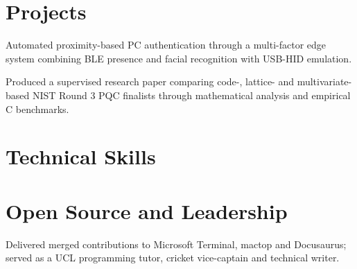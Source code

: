 \vfill
\section{Projects}

\begin{resumeBullets}
  \item Automated proximity-based PC authentication through a multi-factor edge system combining BLE presence and facial recognition with USB-HID emulation.
\end{resumeBullets}

\begin{resumeBullets}
  \item Produced a supervised research paper comparing code-, lattice- and multivariate-based NIST Round 3 PQC finalists through mathematical analysis and empirical C benchmarks.
\end{resumeBullets}

\vfill
\section{Technical Skills}

\vfill
\section{Open Source and Leadership}
\begin{resumeBullets}
  \item Delivered merged contributions to Microsoft Terminal, mactop and Docusaurus; served as a UCL programming tutor, cricket vice-captain and technical writer.
\end{resumeBullets}
